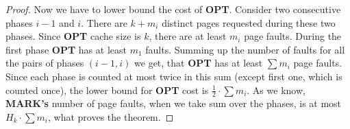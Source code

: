 \begin{proof}
Now we have to lower bound the cost of \textbf{OPT}. Consider two consecutive 
phases $i-1$ and $i$. There are $k + m_i$ distinct pages requested during these two 
phases. Since \textbf{OPT} cache size is $k$, there are at least $m_i$ page faults. 
During the first phase \textbf{OPT} has at least $m_1$ faults. Summing up the 
number of faults for all
the pairs of phases $(i-1, i)$ we get, that \textbf{OPT} has at least $\sum m_i$ page faults. Since each phase 
is counted at most twice in this sum
(except first one, which is counted once), the lower bound for 
\textbf{OPT} cost is $\frac{1}{2} \cdot \sum m_i$. As we know, \textbf{MARK's} 
number of page faults, when we take sum over the phases, is at most $H_k \cdot \sum 
m_i$, what proves the theorem.
\end{proof}
